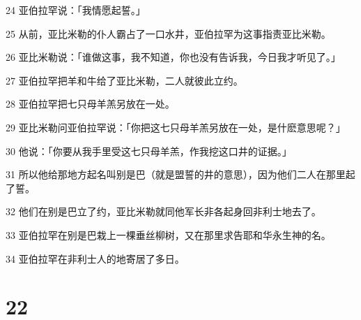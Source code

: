 \par 24 亚伯拉罕说：「我情愿起誓。」
\par 25 从前，亚比米勒的仆人霸占了一口水井，亚伯拉罕为这事指责亚比米勒。
\par 26 亚比米勒说：「谁做这事，我不知道，你也没有告诉我，今日我才听见了。」
\par 27 亚伯拉罕把羊和牛给了亚比米勒，二人就彼此立约。
\par 28 亚伯拉罕把七只母羊羔另放在一处。
\par 29 亚比米勒问亚伯拉罕说：「你把这七只母羊羔另放在一处，是什麽意思呢？」
\par 30 他说：「你要从我手里受这七只母羊羔，作我挖这口井的证据。」
\par 31 所以他给那地方起名叫别是巴（就是盟誓的井的意思），因为他们二人在那里起了誓。
\par 32 他们在别是巴立了约，亚比米勒就同他军长非各起身回非利士地去了。
\par 33 亚伯拉罕在别是巴栽上一棵垂丝柳树，又在那里求告耶和华永生神的名。
\par 34 亚伯拉罕在非利士人的地寄居了多日。

\chapter{22}

